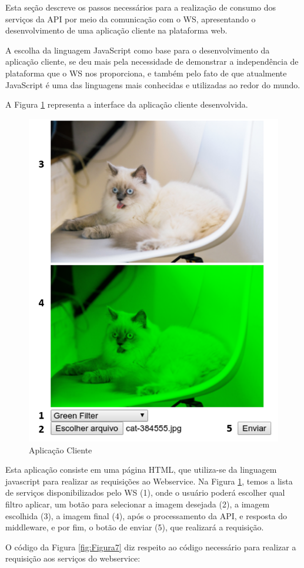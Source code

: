 \documentclass[12pt]{article}
\begin{document}
Esta seção descreve os passos necessários para a realização de consumo dos serviços da API por meio da comunicação com o WS, apresentando o desenvolvimento de uma aplicação cliente na plataforma web.

A escolha da linguagem JavaScript como base para o desenvolvimento da aplicação cliente, se deu mais pela necessidade de demonstrar a independência de plataforma que o WS nos proporciona, e também pelo fato de que atualmente JavaScript é uma das linguagens mais conhecidas e utilizadas ao redor do mundo.

A Figura \ref{fig:Figura6} representa a interface da aplicação cliente desenvolvida.

\begin{figure}[ht]
	\centering
	\includegraphics[width=.5\textwidth]{aplicacao-cliente.png}
	\caption{Aplicação Cliente}
	\label{fig:Figura6}
\end{figure}

Esta aplicação consiste em uma página HTML, que utiliza-se da linguagem javascript para realizar as requisições ao Webservice. Na Figura \ref{fig:Figura6}, temos a lista de serviços disponibilizados pelo WS (1), onde o usuário poderá escolher qual filtro aplicar, um botão para selecionar a imagem desejada (2), a imagem escolhida (3), a imagem final (4), após o processamento da API, e resposta do middleware, e por fim, o botão de enviar (5), que realizará a requisição.

O código da Figura \ref{fig:Figura7} diz respeito ao código necessário para realizar a requisição aos serviços do webservice:
\end{document}
